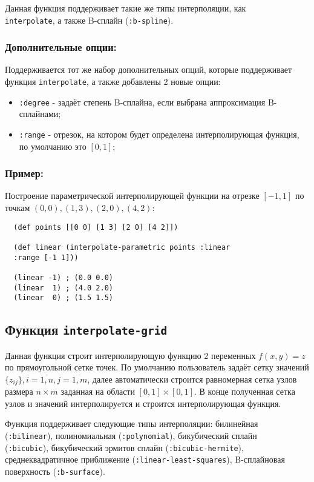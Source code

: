 Данная функция поддерживает такие же типы интерполяции, как \\ \texttt{interpolate}, а также B-сплайн (\texttt{:b-spline}).

\subsubsection{Дополнительные опции:}

Поддерживается тот же набор дополнительных опций, которые поддерживает функция \texttt{interpolate}, а также добавлены 2 новые опции:
\begin{itemize}
\item \texttt{:degree} - задаёт степень B-сплайна, если выбрана аппроксимация B-сплайнами;
\item \texttt{:range} - отрезок, на котором будет определена интерполирующая функция, по умолчанию это $[0, 1]$;
\end{itemize}

\subsubsection{Пример:}

Построение параметрической интерполирующей функции на отрезке $[-1, 1]$ по точкам $(0, 0), (1, 3), (2, 0), (4, 2)$:

\begin{verbatim}
  (def points [[0 0] [1 3] [2 0] [4 2]])

  (def linear (interpolate-parametric points :linear
  :range [-1 1]))

  (linear -1) ; (0.0 0.0)
  (linear  1) ; (4.0 2.0)
  (linear  0) ; (1.5 1.5)
\end{verbatim}


\subsection{Функция \texttt{interpolate-grid}}

Данная функция строит интерполирующую функцию 2 переменных $f(x, y) = z$ по прямоугольной сетке точек. По умолчанию пользователь задаёт сетку значений $\{z_{ij}\}, i=\overline{1, n}, j=\overline{1, m}$, далее автоматически строится равномерная сетка узлов размера $n \times m$ заданная на области $[0, 1] \times [0, 1]$. В конце полученная сетка узлов и значений интерполируeтся и строится интерполирующая функция.

Функция поддерживает следующие типы интерполяции: билинейная \\ (\texttt{:bilinear}), полиномиальная (\texttt{:polynomial}), бикубический сплайн \\ (\texttt{:bicubic}), бикубический эрмитов сплайн (\texttt{:bicubic-hermite}), среднеквадратичное приближение (\texttt{:linear-least-squares}), B-сплайновая поверхность (\texttt{:b-surface}).

